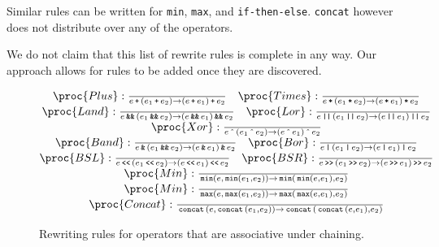 Similar rules can be written for \texttt{min}, \texttt{max}, and
\texttt{if-then-else}. \texttt{concat} however does not distribute over any of
the operators.


We do not claim that this list of rewrite rules is complete in any way. Our
approach allows for rules to be added once they are discovered.

\begin{figure*}[htbp!]
\[
\begin{matrix}
\proc{Plus}:{\over
e \lp \p{e_1 \lp e_2} \rightarrow \p{ e \lp e_1} \lp e_2
}\quad
\proc{Times}:{\over
e \lt \p{e_1\lt e_2} \rightarrow \p{e \lt e_1} \lt e_2
}\\
\proc{Land}:{\over
e \LAND \p{e_1 \LAND e_2} \rightarrow \p{ e \LAND e_1} \LAND e_2
}\quad
\proc{Lor}:{\over
e \LOR \p{e_1\LOR e_2} \rightarrow \p{e \LOR e_1} \LOR e_2
}\\
\proc{Xor}:{\over
e \LBXOR \p{e_1 \LBXOR e_2} \rightarrow \p{ e \LBXOR e_1} \LBXOR e_2
}\\
\proc{Band}:{\over
e \LBAND \p{e_1 \LAND e_2} \rightarrow \p{ e \LBAND e_1} \LBAND e_2
}\quad
\proc{Bor}:{\over
e \LBOR \p{e_1\LBOR e_2} \rightarrow \p{e \LBOR e_1} \LBOR e_2
}\\
\proc{BSL}:{\over
e \LBSL \p{e_1 \LBSL e_2} \rightarrow \p{ e \LBSL e_1} \LBSL e_2
}\quad
\proc{BSR}:{\over
e \LBSR \p{e_1\LBSR e_2} \rightarrow \p{e \LBSR e_1} \LBSR e_2
}\\
\proc{Min}:{\over
\LMIN\p{e, \LMIN\p{e_1, e_2}} \rightarrow \LMIN\p{\LMIN\p{ e, e_1}, e_2}
}\\
\proc{Min}:{\over
\LMAX\p{e, \LMAX\p{e_1, e_2}} \rightarrow \LMAX\p{\LMAX\p{ e, e_1}, e_2}
}\\
\proc{Concat}:{\over
\LCONCAT\p{e, \LCONCAT\p{e_1, e_2}} \rightarrow \LCONCAT\p{\LCONCAT\p{ e, e_1}, e_2}
}\\
\end{matrix}
\]
\caption[]{Rewriting rules for operators that are associative under chaining.}
\label{figure:rewriting-chaining}
\end{figure*}

